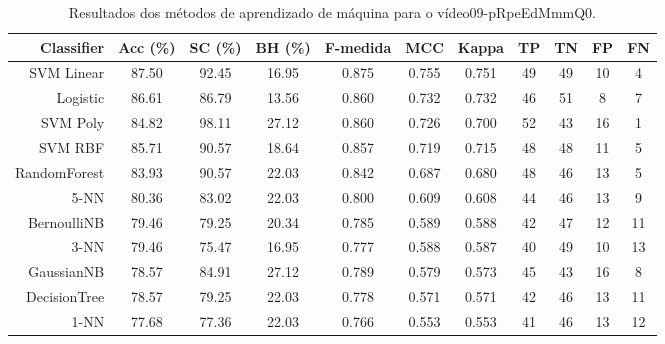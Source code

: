 \begin{table}[!htb]
\centering
\caption{Resultados dos métodos de aprendizado de máquina para o vídeo09-pRpeEdMmmQ0.}
\label{tab:09-pRpeEdMmmQ0}
\begin{tabular}{r|c|c|c|c|c|c|c|c|c|c}
\hline\hline
Classifier & Acc (\%) & SC (\%) & BH (\%) & F-medida & MCC & Kappa & TP & TN & FP & FN \\ \hline
SVM Linear & 87.50 & 92.45 & 16.95 & 0.875 & 0.755 & 0.751 & 49 & 49 & 10 & 4 \\ 
Logistic & 86.61 & 86.79 & 13.56 & 0.860 & 0.732 & 0.732 & 46 & 51 & 8 & 7 \\ 
SVM Poly & 84.82 & 98.11 & 27.12 & 0.860 & 0.726 & 0.700 & 52 & 43 & 16 & 1 \\ 
SVM RBF & 85.71 & 90.57 & 18.64 & 0.857 & 0.719 & 0.715 & 48 & 48 & 11 & 5 \\ 
RandomForest & 83.93 & 90.57 & 22.03 & 0.842 & 0.687 & 0.680 & 48 & 46 & 13 & 5 \\ 
5-NN & 80.36 & 83.02 & 22.03 & 0.800 & 0.609 & 0.608 & 44 & 46 & 13 & 9 \\ 
BernoulliNB & 79.46 & 79.25 & 20.34 & 0.785 & 0.589 & 0.588 & 42 & 47 & 12 & 11 \\ 
3-NN & 79.46 & 75.47 & 16.95 & 0.777 & 0.588 & 0.587 & 40 & 49 & 10 & 13 \\ 
GaussianNB & 78.57 & 84.91 & 27.12 & 0.789 & 0.579 & 0.573 & 45 & 43 & 16 & 8 \\ 
DecisionTree & 78.57 & 79.25 & 22.03 & 0.778 & 0.571 & 0.571 & 42 & 46 & 13 & 11 \\ 
1-NN & 77.68 & 77.36 & 22.03 & 0.766 & 0.553 & 0.553 & 41 & 46 & 13 & 12 \\ 
\hline\hline
\end{tabular}
\end{table}

